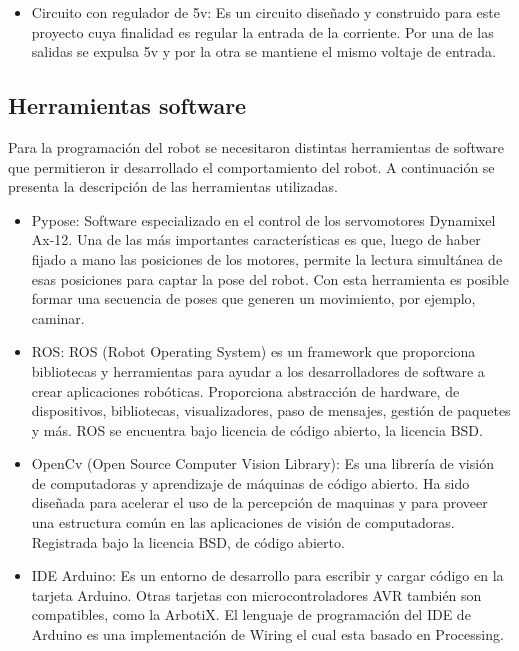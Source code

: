 \begin{itemize}
\item Circuito con regulador de 5v: Es un circuito diseñado y construido para este proyecto cuya finalidad es regular la 
entrada de la corriente. Por una de las salidas se expulsa 5v y por la otra se mantiene el mismo voltaje de entrada. 
\end{itemize}





\subsection{ Herramientas software }

Para la programación del robot se necesitaron distintas herramientas de software que permitieron ir desarrollado el comportamiento del robot. A continuación se presenta la descripción de las herramientas utilizadas. 

\begin{itemize}
\item Pypose: Software especializado en el control de los servomotores Dynamixel Ax-12. Una de las más importantes características es que, luego de haber fijado a mano las posiciones de los motores, permite la lectura simultánea de esas posiciones para captar la pose del robot. Con esta herramienta es posible formar una secuencia de poses que generen un movimiento, por ejemplo, caminar. \cite{pypose}

\item ROS: ROS (Robot Operating System) es un framework que proporciona bibliotecas y herramientas para ayudar a los desarrolladores de software a crear aplicaciones robóticas. Proporciona abstracción de hardware,  de dispositivos, bibliotecas, visualizadores, paso de mensajes, gestión de paquetes y más. ROS se encuentra bajo licencia de código abierto, la licencia BSD.

\item OpenCv (Open Source Computer Vision Library): Es una librería de visión de computadoras y aprendizaje de máquinas de código abierto. Ha sido diseñada para acelerar el uso de la percepción de maquinas y para proveer una estructura común en las aplicaciones de visión de computadoras. Registrada bajo la licencia BSD, de código abierto. \cite{opencv}

\item IDE Arduino: Es un entorno de desarrollo para escribir y cargar código en la tarjeta Arduino. Otras tarjetas con microcontroladores AVR también son compatibles, como la ArbotiX. El lenguaje de programación del IDE de Arduino es una implementación de Wiring el cual esta basado en Processing.  \cite{arduino}

\end{itemize}


